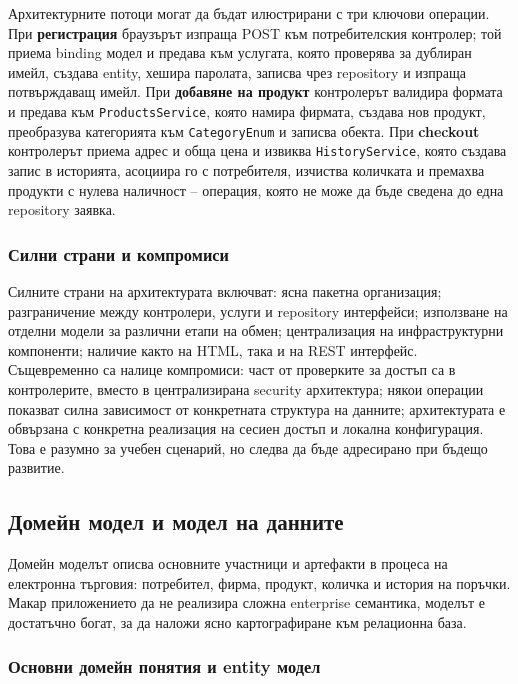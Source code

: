 Архитектурните потоци могат да бъдат илюстрирани с три ключови операции. При \textbf{регистрация} браузърът изпраща POST към потребителския контролер; той приема binding модел и предава към услугата, която проверява за дублиран имейл, създава entity, хешира паролата, записва чрез repository и изпраща потвърждаващ имейл. При \textbf{добавяне на продукт} контролерът валидира формата и предава към \texttt{ProductsService}, която намира фирмата, създава нов продукт, преобразува категорията към \texttt{CategoryEnum} и записва обекта. При \textbf{checkout} контролерът приема адрес и обща цена и извиква \texttt{HistoryService}, която създава запис в историята, асоциира го с потребителя, изчиства количката и премахва продукти с нулева наличност -- операция, която не може да бъде сведена до една repository заявка.

\subsubsection{Силни страни и компромиси}

Силните страни на архитектурата включват: ясна пакетна организация; разграничение между контролери, услуги и repository интерфейси; използване на отделни модели за различни етапи на обмен; централизация на инфраструктурни компоненти; наличие както на HTML, така и на REST интерфейс. Същевременно са налице компромиси: част от проверките за достъп са в контролерите, вместо в централизирана security архитектура; някои операции показват силна зависимост от конкретната структура на данните; архитектурата е обвързана с конкретна реализация на сесиен достъп и локална конфигурация. Това е разумно за учебен сценарий, но следва да бъде адресирано при бъдещо развитие.

\subsection{Домейн модел и модел на данните}

Домейн моделът описва основните участници и артефакти в процеса на електронна търговия: потребител, фирма, продукт, количка и история на поръчки. Макар приложението да не реализира сложна enterprise семантика, моделът е достатъчно богат, за да наложи ясно картографиране към релационна база.

\subsubsection{Основни домейн понятия и entity модел}

